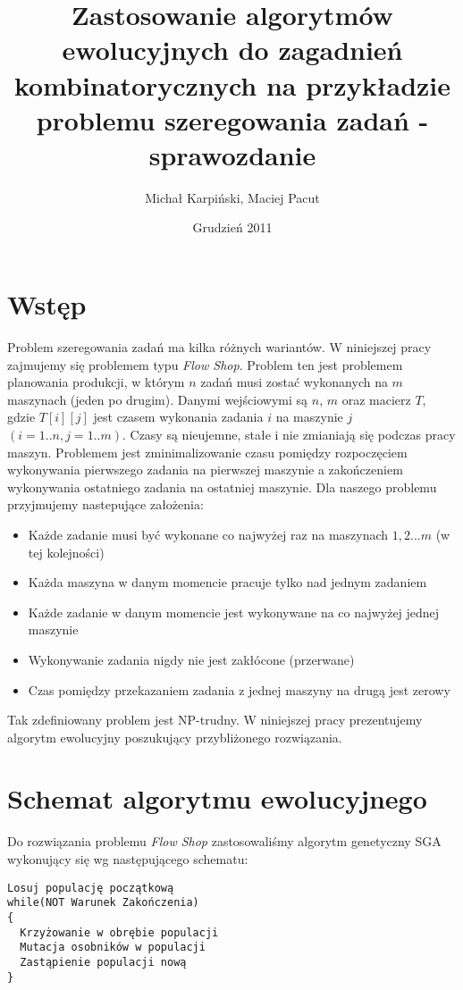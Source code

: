 \documentclass[12pt]{article}
\title{Zastosowanie algorytmów ewolucyjnych do zagadnień
  kombinatorycznych na przykładzie problemu szeregowania zadań - sprawozdanie}
\author{Michał Karpiński, Maciej Pacut}
\date{Grudzień 2011}
\begin{document}
  \maketitle
\section{Wstęp}
Problem szeregowania zadań ma kilka różnych wariantów. W niniejszej pracy zajmujemy się problemem typu {\em Flow Shop}.
Problem ten jest problemem planowania produkcji, w którym $n$ zadań musi zostać wykonanych na $m$ maszynach (jeden po drugim).
Danymi wejściowymi są $n$, $m$ oraz macierz $T$, gdzie $T[i][j]$ jest czasem wykonania zadania $i$ na maszynie $j$ $(i = 1..n, j = 1..m )$.
Czasy są nieujemne, stałe i nie zmianiają się podczas pracy maszyn. Problemem jest zminimalizowanie czasu 
pomiędzy rozpoczęciem wykonywania pierwszego zadania na pierwszej maszynie a zakończeniem wykonywania ostatniego zadania na ostatniej maszynie.
Dla naszego problemu przyjmujemy nastepujące założenia:

\begin{itemize}
  \item Każde zadanie musi być wykonane co najwyżej raz na maszynach $1, 2 ... m$ (w tej kolejności)
  \item Każda maszyna w danym momencie pracuje tylko nad jednym zadaniem
  \item Każde zadanie w danym momencie jest wykonywane na co najwyżej jednej maszynie
  \item Wykonywanie zadania nigdy nie jest zakłócone (przerwane)
  \item Czas pomiędzy przekazaniem zadania z jednej maszyny na drugą jest zerowy
\end{itemize}

Tak zdefiniowany problem jest NP-trudny. W niniejszej pracy prezentujemy algorytm ewolucyjny poszukujący przybliżonego rozwiązania.

\section{Schemat algorytmu ewolucyjnego}

Do rozwiązania problemu {\em Flow Shop} zastosowaliśmy algorytm
genetyczny SGA wykonujący się wg następującego schematu:

\begin{verbatim}
Losuj populację początkową
while(NOT Warunek Zakończenia)
{
  Krzyżowanie w obrębie populacji
  Mutacja osobników w populacji
  Zastąpienie populacji nową
}
\end{verbatim}
\end{document}
